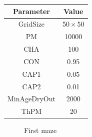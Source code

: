 \begin{center}
 \begin{tabular}{||c c||} 
 \hline
 Parameter & Value \\ [0.5ex] 
 \hline\hline
 GridSize & $50 \times 50$ \\ 
 \hline
 PM & 10000 \\ 
 \hline
 CHA & 100 \\ 
 \hline
 CON & 0.95 \\ 
 \hline
 CAP1 & 0.05 \\ 
 \hline
 CAP2 & 0.01 \\ 
 \hline
 MinAgeDryOut & 2000 \\
 \hline
 ThPM & 20 \\ [1ex] 
 \hline
 \end{tabular}
\end{center}

\begin{figure}[H]
    \centering
    \caption{First maze}
    \label{fig:foobar}
\end{figure}

